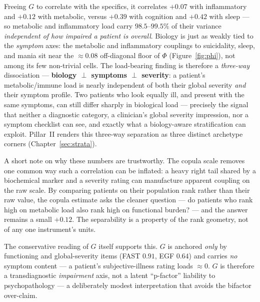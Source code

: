 \begin{keyresult}
Freeing $G$ to correlate with the specifics, it correlates $+0.07$ with inflammatory and $+0.12$ with
metabolic, versus $+0.39$ with cognition and $+0.42$ with sleep --- so metabolic and inflammatory load carry
$98.5$--$99.5\%$ of their variance \emph{independent of how impaired a patient is overall}. Biology is just as
weakly tied to the \emph{symptom} axes: the metabolic and inflammatory couplings to suicidality, sleep, and
mania sit near the $\approx 0.08$ off-diagonal floor of $\Phi$ (Figure~\ref{fig:phi}), not among its few
non-trivial cells. The load-bearing finding is therefore a \emph{three-way} dissociation ---
\textbf{biology $\perp$ symptoms $\perp$ severity}: a patient's metabolic/immune load is nearly independent of
both their global severity \emph{and} their symptom profile. Two patients who look equally ill, and present
with the same symptoms, can still differ sharply in biological load --- precisely the signal that neither a
diagnostic category, a clinician's global severity impression, nor a symptom checklist can see, and exactly
what a biology-aware stratification can exploit. Pillar~II renders this three-way separation as three distinct
archetype corners (Chapter~\ref{sec:strata}).
\end{keyresult}

A short note on why these numbers are trustworthy. The copula scale removes one common way such a correlation
can be inflated: a heavy right tail shared by a biochemical marker and a severity rating can manufacture
apparent coupling on the raw scale. By comparing patients on their population rank rather than their raw value,
the copula estimate asks the cleaner question --- do patients who rank high on metabolic load also rank high on
functional burden? --- and the answer remains a small $+0.12$. The separability is a property of the rank
geometry, not of any one instrument's units.

The conservative reading of $G$ itself supports this. $G$ is anchored \emph{only} by functioning and
global-severity items (FAST $0.91$, EGF $0.64$) and carries \emph{no} symptom content --- a patient's
subjective-illness rating loads $\approx 0$. $G$ is therefore a transdiagnostic \emph{impairment} axis, not a
latent ``p-factor'' liability to psychopathology --- a deliberately modest interpretation that avoids the
bifactor over-claim.

